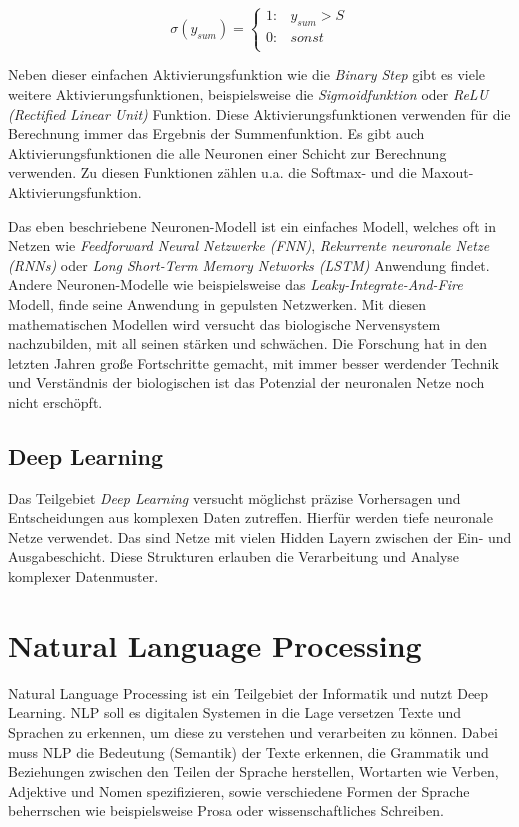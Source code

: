 \begin{equation}\label{eq:activation_function}
	\sigma (y_{sum}) = \left\{
	\begin{array}{cl}
		1: & y_{sum} > S \\
		0: & sonst \\
	\end{array}
	\right.
\end{equation}

Neben dieser einfachen Aktivierungsfunktion wie die \textit{Binary Step} gibt es viele weitere Aktivierungsfunktionen, beispielsweise die \textit{Sigmoidfunktion} oder \textit{ReLU (Rectified Linear Unit)} Funktion. Diese Aktivierungsfunktionen verwenden für die Berechnung immer das Ergebnis der Summenfunktion. Es gibt auch Aktivierungsfunktionen die alle Neuronen einer Schicht zur Berechnung verwenden. Zu diesen Funktionen zählen u.a. die Softmax- und die Maxout-Aktivierungsfunktion.\vspace{0.2cm}

Das eben beschriebene Neuronen-Modell ist ein einfaches Modell, welches oft in Netzen wie \textit{Feedforward Neural Netzwerke (FNN)}, \textit{Rekurrente neuronale Netze (RNNs)} oder \textit{Long Short-Term Memory Networks (LSTM)} Anwendung findet. Andere Neuronen-Modelle wie beispielsweise das \textit{Leaky-Integrate-And-Fire} Modell, finde seine Anwendung in gepulsten Netzwerken. Mit diesen mathematischen Modellen wird versucht das biologische Nervensystem nachzubilden, mit all seinen stärken und schwächen. Die Forschung hat in den letzten Jahren große Fortschritte gemacht, mit immer besser werdender Technik und Verständnis der biologischen ist das Potenzial der neuronalen Netze noch nicht erschöpft.


\subsection{Deep Learning}
Das Teilgebiet \textit{Deep Learning} versucht möglichst präzise Vorhersagen und Entscheidungen aus komplexen Daten zutreffen. Hierfür werden tiefe neuronale Netze verwendet. Das sind Netze mit vielen Hidden Layern zwischen der Ein- und Ausgabeschicht. Diese Strukturen erlauben die Verarbeitung und Analyse komplexer Datenmuster.


\section{Natural Language Processing}
Natural Language Processing ist ein Teilgebiet der Informatik und nutzt Deep Learning. NLP soll es digitalen Systemen in die Lage versetzen Texte und Sprachen zu erkennen, um diese zu verstehen und verarbeiten zu können. Dabei muss NLP die Bedeutung (Semantik) der Texte erkennen, die Grammatik und Beziehungen zwischen den Teilen der Sprache herstellen, Wortarten wie Verben, Adjektive und Nomen spezifizieren, sowie verschiedene Formen der Sprache beherrschen wie beispielsweise Prosa oder wissenschaftliches Schreiben.\vspace{0.2cm}

